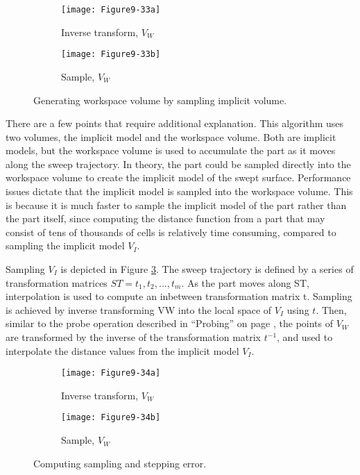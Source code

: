 \begin{figure}[htb]
    \centering
	\begin{subfigure}[h]{0.48\linewidth}
		\texttt{[image: Figure9-33a]}
		\captionsetup{justification=centering}
		\caption{Inverse transform, $V_W$}
		\label{fig:Figure9-33a}
	\end{subfigure}
	\hfill
	\begin{subfigure}[h]{0.48\linewidth}
		\texttt{[image: Figure9-33b]}
		\captionsetup{justification=centering}
		\caption{Sample, $V_W$}
		\label{fig:Figure9-33b}
	\end{subfigure}
	\caption{Generating workspace volume by sampling implicit volume.}\label{fig:Figure9-33}
\end{figure}

There are a few points that require additional explanation. This algorithm uses two volumes, the implicit model and the workspace volume. Both are implicit models, but the workspace volume is used to accumulate the part as it moves along the sweep trajectory. In theory, the part could be sampled directly into the workspace volume to create the implicit model of the swept surface. Performance issues dictate that the implicit model is sampled into the workspace volume. This is because it is much faster to sample the implicit model of the part rather than the part itself, since computing the distance function from a part that may consist of tens of thousands of cells is relatively time consuming, compared to sampling the implicit model $V_I$.

Sampling $V_I$ is depicted in Figure \ref{fig:Figure9-33}. The sweep trajectory is defined by a series of transformation matrices $ST = {t_1, t_2,..., t_m}$. As the part moves along ST, interpolation is used to compute an inbetween transformation matrix t. Sampling is achieved by inverse transforming VW into the local space of $V_I$ using $t$. Then, similar to the probe operation described in ``Probing'' on page \pageref{subsec:probing}, the points of $V_W$ are transformed by the inverse of the transformation matrix $t^{-1}$, and used to interpolate the distance values from the implicit model $V_I$.

\begin{figure}[htb]
    \centering
	\begin{subfigure}[h]{0.48\linewidth}
		\texttt{[image: Figure9-34a]}
		\captionsetup{justification=centering}
		\caption{Inverse transform, $V_W$}
		\label{fig:Figure9-34a}
	\end{subfigure}
	\hfill
	\begin{subfigure}[h]{0.48\linewidth}
		\texttt{[image: Figure9-34b]}
		\captionsetup{justification=centering}
		\caption{Sample, $V_W$}
		\label{fig:Figure9-34b}
	\end{subfigure}
	\caption{Computing sampling and stepping error.}\label{fig:Figure9-34}
\end{figure}

